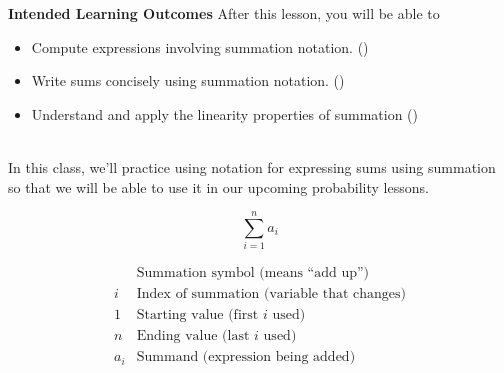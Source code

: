 \documentclass[10pt]{article}
\begin{document}
\pagestyle{otherpages}
\thispagestyle{firstpage}

\textbf{Intended Learning Outcomes}
After this lesson, you will be able to 

\begin{itemize}
    \item Compute expressions involving summation notation. ()
    \item Write sums concisely using summation notation. ()
    \item Understand and apply the linearity properties of summation ()
\end{itemize}

\vspace{-0.6cm}

\hrulefill\\

In this class, we'll practice using notation for expressing sums using summation so that we will be able to use it in our upcoming probability lessons.
{
\[
\sum_{i=1}^{n} a_i
\]

\[
\begin{array}{lcl}
  &\text{Summation symbol (means “add up”)}\\[6pt]
i &\text{Index of summation (variable that changes)}\\[6pt]
1 & \text{Starting value (first $i$ used)}\\[6pt]
n & \text{Ending value (last $i$ used)}\\[6pt]
a_i &  \text{Summand (expression being added)}
\end{array}
\]
}
\vfill
\end{document}
